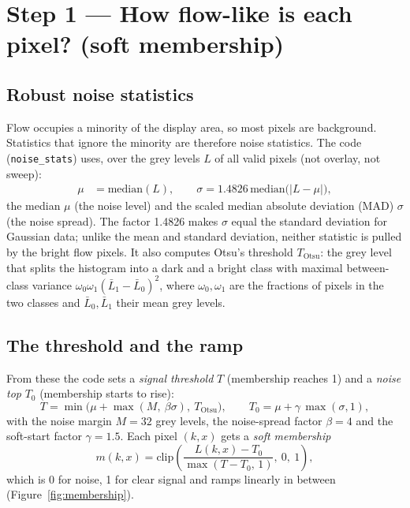 \documentclass[11pt,a4paper]{article}
\newcommand{\code}[1]{\texttt{\small #1}}
\begin{document}
\section{Step 1 --- How flow-like is each pixel? (soft membership)}
\label{sec:memb}

\subsection{Robust noise statistics}
Flow occupies a minority of the display area, so most pixels are background. Statistics that ignore the minority are
therefore noise statistics. The code (\code{noise\_stats}) uses, over the grey levels $L$ of all valid pixels
(not overlay, not sweep):
\begin{align}
\mu &= \mathrm{median}(L), \qquad \sigma = 1.4826\,\mathrm{median}\big(|L-\mu|\big),
\end{align}
the median $\mu$ (the noise level) and the scaled median absolute deviation (MAD) $\sigma$ (the noise spread). The
factor 1.4826 makes $\sigma$ equal the standard deviation for Gaussian data; unlike the mean and standard deviation,
neither statistic is pulled by the bright flow pixels. It also computes Otsu's threshold $T_{\mathrm{Otsu}}$: the grey
level that splits the histogram into a dark and a bright class with maximal between-class variance
$\omega_0 \omega_1 (\bar L_1 - \bar L_0)^2$, where $\omega_0, \omega_1$ are the fractions of pixels in the two classes
and $\bar L_0, \bar L_1$ their mean grey levels.

\subsection{The threshold and the ramp}
From these the code sets a \emph{signal threshold} $T$ (membership reaches 1) and a \emph{noise top} $T_0$
(membership starts to rise):
\begin{equation}
T = \min\!\big(\mu + \max(M,\ \beta\sigma),\ T_{\mathrm{Otsu}}\big), \qquad T_0 = \mu + \gamma\,\max(\sigma, 1),
\end{equation}
with the noise margin $M = 32$ grey levels, the noise-spread factor $\beta = 4$ and the soft-start factor
$\gamma = 1.5$. Each pixel $(k,x)$ gets a \emph{soft membership}
\begin{equation}
m(k,x) = \mathrm{clip}\!\left(\frac{L(k,x) - T_0}{\max(T - T_0,\, 1)},\ 0,\ 1\right),
\label{eq:memb}
\end{equation}
which is 0 for noise, 1 for clear signal and ramps linearly in between (Figure~\ref{fig:membership}).
\end{document}
